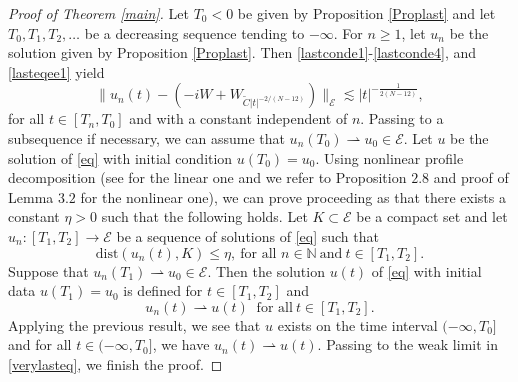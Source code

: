 \documentclass[a4paper,two-side,10pt]{amsart}
\newtheorem{cor}{Corollary}[section]
\numberwithin{equation}{section}
\newcommand{\N}{\mathbb{N}}
\begin{document}
\begin{proof}[Proof of Theorem \ref{main}]
Let $T_0<0$ be given by Proposition \ref{Proplast} and let $T_0,T_1,T_2,\ldots$ be a decreasing sequence tending to $-\infty$. For $n\geq 1$, let $u_n$ be the solution given by Proposition \ref{Proplast}. Then \eqref{lastconde1}-\eqref{lastconde4}, and \eqref{lasteqee1} yield
\begin{equation}
\label{verylasteq}
\|u_n (t) - (-iW +W_{\tilde{C} |t|^{-2/(N-12)}})\|_{\mathcal{E}}\lesssim |t|^{-\frac{1}{2(N-12)}},
\end{equation}
for all $t\in [T_n ,T_0]$ and with a constant independent of $n$. Passing to a subsequence if necessary, we can assume that $u_n (T_0) \rightharpoonup u_0 \in \mathcal{E}$. Let $u$ be the solution of \eqref{eq} with initial condition $u(T_0)=u_0$. Using nonlinear profile decomposition (see \cite{MR3462127} for the linear one and we refer to \cite{MR2781926} Proposition $2.8$ and  \cite{MR2654778} proof of Lemma $3.2$ for the nonlinear one), we can prove proceeding as \cite{MR3904767} that there exists a constant $\eta>0$ such that the following holds. Let $K\subset \mathcal{E}$ be a compact set and let $u_n : [T_1, T_2] \rightarrow \mathcal{E}$ be a sequence of solutions of \eqref{eq} such that
$$\text{dist} (u_n (t) , K)\leq \eta , \ \text{for all } n\in \N \ \text{and}\ t\in [T_1 ,T_2].$$
Suppose that $u_n (T_1) \rightharpoonup u_0 \in \mathcal{E}$. Then the solution $u(t)$ of \eqref{eq} with initial data $u(T_1)=u_0$ is defined for $t\in [T_1 ,T_2]$ and 
$$u_n (t) \rightharpoonup u(t)\ \text{ for all}\  t\in [T_1 ,T_2].$$
Applying the previous result, we see that $u$ exists on the time interval $(-\infty , T_0]$ and for all $t\in (-\infty ,T_0]$, we have $u_n (t) \rightharpoonup u(t)$. Passing to the weak limit in \eqref{verylasteq}, we finish the proof.
\end{proof}






\end{document}
